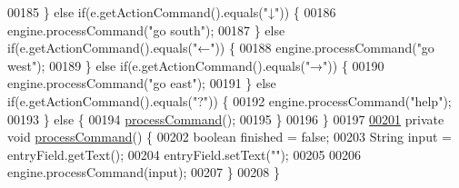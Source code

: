 \begin{DoxyCode}
00185         \} \textcolor{keywordflow}{else} \textcolor{keywordflow}{if}(e.getActionCommand().equals(\textcolor{stringliteral}{"↓"})) \{
00186             engine.processCommand(\textcolor{stringliteral}{"go south"});
00187         \} \textcolor{keywordflow}{else} \textcolor{keywordflow}{if}(e.getActionCommand().equals(\textcolor{stringliteral}{"←"})) \{
00188             engine.processCommand(\textcolor{stringliteral}{"go west"});
00189         \} \textcolor{keywordflow}{else} \textcolor{keywordflow}{if}(e.getActionCommand().equals(\textcolor{stringliteral}{"→"})) \{
00190             engine.processCommand(\textcolor{stringliteral}{"go east"});
00191         \} \textcolor{keywordflow}{else} \textcolor{keywordflow}{if}(e.getActionCommand().equals(\textcolor{stringliteral}{"?"})) \{
00192             engine.processCommand(\textcolor{stringliteral}{"help"});
00193         \} \textcolor{keywordflow}{else} \{
00194             \hyperlink{classUserInterface_a8729aa2e61c87f957663577707f449a5}{processCommand}();
00195         \}
00196     \}
00197 
\hypertarget{UserInterface_8java_source_l00201}{}\hyperlink{classUserInterface_a8729aa2e61c87f957663577707f449a5}{00201}     \textcolor{keyword}{private} \textcolor{keywordtype}{void} \hyperlink{classUserInterface_a8729aa2e61c87f957663577707f449a5}{processCommand}() \{
00202         \textcolor{keywordtype}{boolean} finished = \textcolor{keyword}{false};
00203         String input = entryField.getText();
00204         entryField.setText(\textcolor{stringliteral}{""});
00205 
00206         engine.processCommand(input);
00207     \}
00208 \}
\end{DoxyCode}
